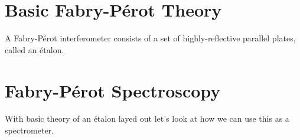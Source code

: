 \documentclass{article}
\begin{document}

\section{Basic Fabry-P\'{e}rot Theory}
A Fabry-P\'{e}rot interferometer consists of a set of highly-reflective parallel plates, called an \'{e}talon.


\section{Fabry-P\'{e}rot Spectroscopy}
With basic theory of an \'{e}talon layed out let's look at how we can use this as a spectrometer.



%

%

\end{document}
